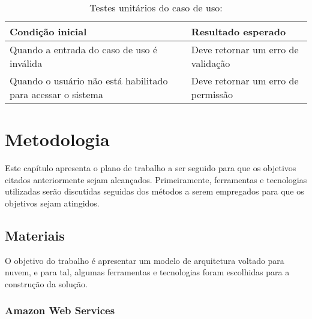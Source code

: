 



\begin{table}[h]
\caption{Testes unitários do caso de uso: }
\label{tab:}
\begin{tabularx}{\textwidth}{p{} p{}}
\toprule
\textbf{Condição inicial} & \textbf{Resultado esperado} \\ \midrule

Quando a entrada do caso de uso é inválida & Deve retornar um erro de validação \\ \hline

Quando o usuário não está habilitado para acessar o sistema & Deve retornar um erro de permissão \\ \hline

\bottomrule
\end{tabularx}
\end{table}











\chapter{Metodologia}\label{cap:metodologia}


Este capítulo apresenta o plano de trabalho a ser seguido para que os objetivos citados
anteriormente sejam alcançados. Primeiramente, ferramentas e tecnologias utilizadas serão discutidas seguidas dos métodos a serem empregados para que os objetivos sejam atingidos.

\section{Materiais}\label{sec:materiais}

O objetivo do trabalho é apresentar um modelo de arquitetura voltado para nuvem, e para tal, algumas ferramentas e tecnologias foram escolhidas para a construção da solução.

\subsection{Amazon Web Services}\label{subsec:amazonWebServices}


